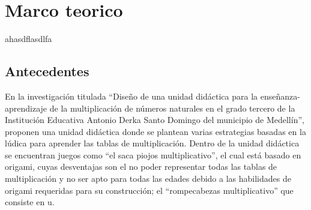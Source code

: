 \chapter{Marco teorico}
ahasdflasdlfa
\section{Antecedentes}
En la investigación \cite{usuga2014diseno} titulada “Diseño de una unidad didáctica para la enseñanza-aprendizaje de la multiplicación de números naturales en el grado tercero de la Institución Educativa Antonio Derka Santo Domingo del municipio de Medellín”, proponen una unidad didáctica donde se plantean varias estrategias basadas en la lúdica para aprender las tablas de multiplicación. Dentro de la unidad didáctica se encuentran juegos como “el saca piojos multiplicativo”, el cual está basado en origami, cuyas desventajas son el no poder representar todas las tablas de multiplicación y no ser apto para todas las edades debido a las habilidades de origami requeridas para su construcción; el “rompecabezas multiplicativo” que consiste en u.